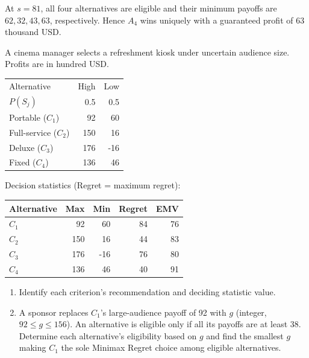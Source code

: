 At $s=81$, all four alternatives are eligible and their minimum
payoffs are $62,32,43,63$, respectively. Hence $A_4$ wins uniquely
with a guaranteed profit of 63 thousand USD.
\secInicio[sec:q1]



A cinema manager selects a refreshment kiosk under uncertain audience size. Profits are in hundred USD.

\begin{center}\small\setlength{\tabcolsep}{4pt}
	\begin{tabular}{lrr}\toprule
		Alternative & High & Low\\
		$P(S_j)$ & 0.5 & 0.5\\ \midrule
				Portable ($C_1$) & 92 & 60\\
		Full-service ($C_2$) & 150 & 16\\
		Deluxe ($C_3$) & 176 & -16\\
		Fixed ($C_4$) & 136 & 46\\
		\bottomrule
	\end{tabular}
\end{center} \vspace{-3mm}

Decision statistics (Regret = maximum regret):

\begin{center}\small\setlength{\tabcolsep}{4pt}
	\begin{tabular}{lrrrr}\toprule
		Alternative & Max & Min & Regret & EMV\\ \midrule
				$C_1$ & 92 & 60 & 84 & 76\\
		$C_2$ & 150 & 16 & 44 & 83\\
		$C_3$ & 176 & -16 & 76 & 80\\
		$C_4$ & 136 & 46 & 40 & 91\\
		\bottomrule
	\end{tabular}
\end{center}

\begin{enumerate}[label=\textbf{(\alph*)},leftmargin=*]
	\item Identify each criterion's recommendation and deciding statistic value. 

	\item A sponsor replaces $C_1$'s large-audience payoff of 92 with $g$ (integer, $92\leq g\leq156$). An alternative is eligible only if all its payoffs are at least 38. Determine each alternative's eligibility based on $g$ and find the smallest $g$ making $C_1$ the sole Minimax Regret choice among eligible alternatives. 
\end{enumerate}
\label{sol:q2a}
